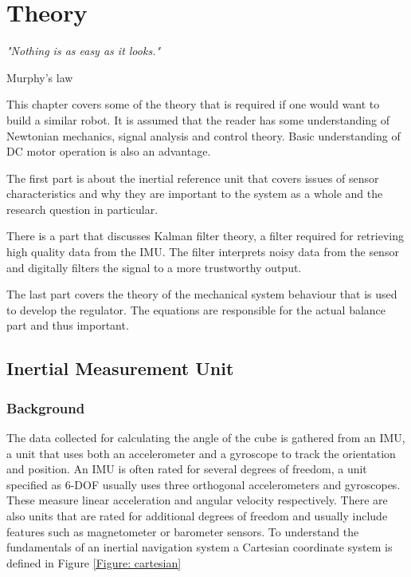 \documentclass[a4paper,11pt]{kth-mag}
\begin{document}
\chapter{Theory} \label{chapter: theory}
\epigraph{\textit{"Nothing is as easy as it looks."}}{Murphy's law}
This chapter covers some of the theory that is required if one would want to build a similar robot. It is assumed that the reader has some understanding of Newtonian mechanics, signal analysis and control theory. Basic understanding of DC motor operation is also an advantage.

The first part is about the inertial reference unit that covers issues of sensor characteristics and why they are important to the system as a whole and the research question in particular.

There is a part that discusses Kalman filter theory, a filter required for retrieving high quality data from the IMU. The filter interprets noisy data from the sensor and digitally filters the signal to a more trustworthy output. 

The last part covers the theory of the mechanical system behaviour that is used to develop the regulator. The equations are responsible for the actual balance part and thus important. 

\section{Inertial Measurement Unit} \label{section:IMU}
\subsection{Background}
The data collected for calculating the angle of the cube is gathered from an IMU, a unit that uses both an accelerometer and a gyroscope to track the orientation and position. An IMU is often rated for several degrees of freedom, a unit specified as 6-DOF usually uses three orthogonal accelerometers and gyroscopes. These measure linear acceleration and angular velocity respectively. There are also units that are rated for additional degrees of freedom and usually include features such as magnetometer or barometer sensors.   
To understand the fundamentals of an inertial navigation system a Cartesian coordinate system is defined in Figure \ref{Figure: cartesian}
\end{document}
